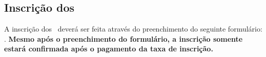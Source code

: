 \subsection{Inscrição dos \CapBasicUnitPl}

A inscrição dos \BasicUnitPl\ deverá ser feita através do preenchimento do seguinte formulário: \urls{\FormsURL}. \textbf{Mesmo após o preenchimento do formulário, a inscrição somente estará confirmada após o pagamento da taxa de inscrição.}
